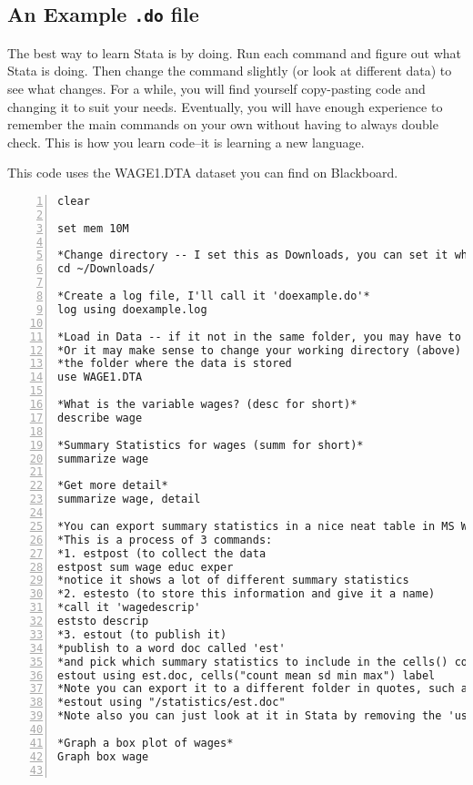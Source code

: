 \documentclass{article}
\begin{document}
\subsection{An Example \texttt{.do} file}

The best way to learn Stata is by doing. Run each command and figure out what Stata is doing. Then change the command slightly (or look at different data) to see what changes. For a while, you will find yourself copy-pasting code and changing it to suit your needs. Eventually, you will have enough experience to remember the main commands on your own without having to always double check. This is how you learn code--it is learning a new language.

This code uses the WAGE1.DTA dataset you can find on Blackboard. 

	\begin{Verbatim}[frame=single, numbers=left, numbersep=2pt] 
clear

set mem 10M 

*Change directory -- I set this as Downloads, you can set it wherever you wish*
cd ~/Downloads/

*Create a log file, I'll call it 'doexample.do'*
log using doexample.log

*Load in Data -- if it not in the same folder, you may have to do this manually
*Or it may make sense to change your working directory (above) using 'cd' to 
*the folder where the data is stored 
use WAGE1.DTA

*What is the variable wages? (desc for short)*
describe wage

*Summary Statistics for wages (summ for short)*
summarize wage

*Get more detail*
summarize wage, detail

*You can export summary statistics in a nice neat table in MS Word
*This is a process of 3 commands:
*1. estpost (to collect the data
estpost sum wage educ exper
*notice it shows a lot of different summary statistics 
*2. estesto (to store this information and give it a name)
*call it 'wagedescrip'
eststo descrip
*3. estout (to publish it)
*publish to a word doc called 'est'
*and pick which summary statistics to include in the cells() command
estout using est.doc, cells("count mean sd min max") label
*Note you can export it to a different folder in quotes, such as 
*estout using "/statistics/est.doc" 
*Note also you can just look at it in Stata by removing the 'using est.doc' portion

*Graph a box plot of wages*
Graph box wage 


\end{Verbatim}
\end{document}
